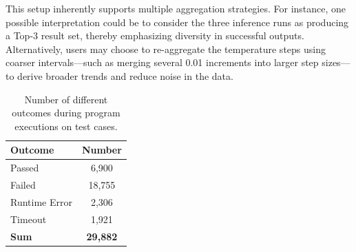 This setup inherently supports multiple aggregation strategies.
For instance, one possible interpretation could be to consider the three inference runs as producing a Top-3 result set, thereby emphasizing diversity in successful outputs.
Alternatively, users may choose to re-aggregate the temperature steps using coarser intervals—such as merging several 0.01 increments into larger step sizes—to derive broader trends and reduce noise in the data.

\begin{table}[h]
	\centering
	\begin{tabular}{|l|c|}
		\hline
		\textbf{Outcome} & \textbf{Number}  \\ \hline
		Passed           & 6,900            \\ \hline
		Failed           & 18,755           \\ \hline
		Runtime Error    & 2,306            \\ \hline
		Timeout          & 1,921            \\ \hline
		\textbf{Sum}     & \textbf{29,882}  \\ \hline
	\end{tabular}
	\caption{Number of different outcomes during program executions on test cases.}
	\label{th4:table:outcomes}
\end{table}

